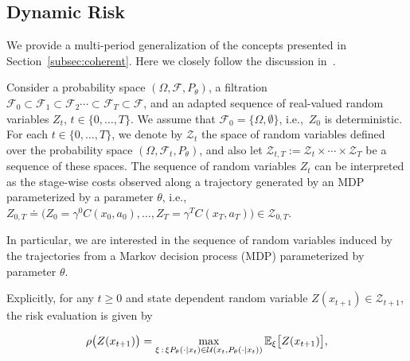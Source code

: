 \subsection{Dynamic Risk}
We provide a multi-period generalization of the concepts presented in Section~\ref{subsec:coherent}. Here we closely follow the discussion in~\citet{ruszczynski2010risk}.

Consider a probability space $(\Omega, \mathcal F, P_\theta)$, a filtration $\mathcal F_0\subset \mathcal F_1\subset \mathcal F_2 \cdots \subset \mathcal F_T \subset \mathcal F$, and an adapted sequence of real-valued random variables $Z_t$, $t\in \{0, \ldots,T\}$. We assume that $\mathcal F_0 = \{\Omega, \emptyset\}$, i.e.,~$Z_0$ is deterministic. For each $t\in\{0, \ldots, T\}$, we denote by $\mathcal Z_t$ the space of random variables defined over the probability space $(\Omega, \mathcal F_t, P_\theta)$, and also let $\mathcal Z_{t, T}:=\mathcal Z_t \times \cdots \times \mathcal Z_T$ be a sequence of these spaces. The sequence of random variables $Z_t$ can be interpreted as the stage-wise costs observed along a trajectory generated by an MDP parameterized by a parameter $\theta$, i.e.,~$Z_{0,T} \doteq \big(Z_0=\gamma^0C(x_0,a_0),\dots,Z_T=\gamma^TC(x_T,a_T)\big)\in\mathcal Z_{0,T}$.


In particular, we are interested in the sequence of random variables induced by the trajectories from a Markov decision process (MDP) parameterized by parameter $\theta$.

Explicitly, for any $t\geq 0$ and state dependent random variable $Z(x_{t+1})\in\mathcal Z_{t+1}$, the risk evaluation is given by

\begin{small}
\begin{equation}
\label{eq:representation-result}
\rho\big(Z(x_{t+1})\big)=\max_{\xi\,:\, \xi P_\theta(\cdot |x_t)\in {\mathcal{U}}(x_t,P_\theta(\cdot |x_t))}\mathbb E_{\xi}\big[Z(x_{t+1})\big],
\end{equation}
\end{small}

